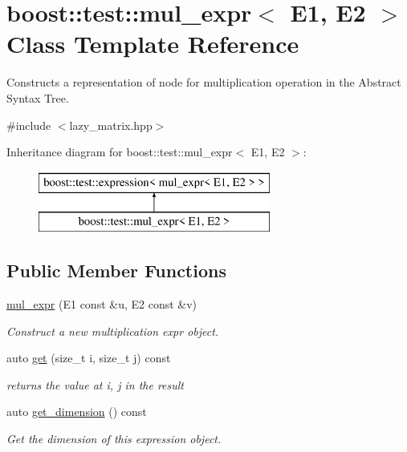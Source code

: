 \hypertarget{classboost_1_1test_1_1mul__expr}{}\section{boost\+::test\+::mul\+\_\+expr$<$ E1, E2 $>$ Class Template Reference}
\label{classboost_1_1test_1_1mul__expr}


Constructs a representation of node for multiplication operation in the Abstract Syntax Tree.  




{\ttfamily \#include $<$lazy\+\_\+matrix.\+hpp$>$}

Inheritance diagram for boost\+::test\+::mul\+\_\+expr$<$ E1, E2 $>$\+:\begin{figure}[H]
\begin{center}
\leavevmode
\includegraphics[height=2.000000cm]{classboost_1_1test_1_1mul__expr}
\end{center}
\end{figure}
\subsection*{Public Member Functions}
\begin{DoxyCompactItemize}
\item 
\mbox{\hyperlink{classboost_1_1test_1_1mul__expr_a7ee6cd43e53cc3a611d11021d2ce7b4a}{mul\+\_\+expr}} (E1 const \&u, E2 const \&v)
\begin{DoxyCompactList}\small\item\em Construct a new multiplication expr object. \end{DoxyCompactList}\item 
auto \mbox{\hyperlink{classboost_1_1test_1_1mul__expr_aa0befa96e7967b7c81c6ae724e81bb93}{get}} (size\+\_\+t i, size\+\_\+t j) const
\begin{DoxyCompactList}\small\item\em returns the value at i, j in the result \end{DoxyCompactList}\item 
auto \mbox{\hyperlink{classboost_1_1test_1_1mul__expr_a2bdebb65cd38018d5cbd5c829ebf3dae}{get\+\_\+dimension}} () const
\begin{DoxyCompactList}\small\item\em Get the dimension of this expression object. \end{DoxyCompactList}\end{DoxyCompactItemize}



